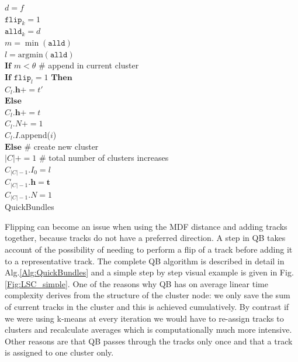 \documentclass[preprint,authoryear,a4paper,10pt,onecolumn]{elsarticle}
\begin{document}
\begin{algorithm}
\hspace*{6em} $d = f$\\
\hspace*{6em} $\texttt{flip}_{k} = 1$\\
\hspace*{4em} $\texttt{alld}_{k} = d$\\
$m=\min(\texttt{alld})$\\
$l=\mathrm{arg min}(\texttt{alld})$\\
$\textbf{If}$ $m < \theta$ \# append in current cluster \\
\hspace*{2em} $\textbf{If}$ $\texttt{flip}_{l}=1$ $\textbf{Then}$\\
\hspace*{4em} $C_{l}.\mathbf{h}+=t'$\\
\hspace*{2em} $\textbf{Else}$ \\
\hspace*{4em} $C_{l}.\mathbf{h}+=t$\\
\hspace*{2em} $C_{l}.N+=1$\\
\hspace*{2em} $C_{l}.I$.append($i$)\\
$\textbf{Else}$ \# create new cluster\\
\hspace*{2em} $|C|+=1$ \# total number of clusters increases\\
\hspace*{2em} $C_{|C|-1}.I_{0}=l$\\
\hspace*{2em} $C_{|C|-1}.\mathbf{h}=\mathbf{t}$\\
\hspace*{2em} $C_{|C|-1}.N=1$\\
\caption{QuickBundles}

\label{Alg:QuickBundles}
\end{algorithm}


Flipping can become an issue when using the MDF distance and adding
tracks together, because tracks do not have a preferred direction.
A step in QB takes account of the possibility of needing to perform
a flip of a track before adding it to a representative track. The
complete QB algorithm is described in detail in Alg.\ref{Alg:QuickBundles}
and a simple step by step visual example is given in Fig.\ref{Fig:LSC_simple}.
One of the reasons why QB has on average linear time complexity derives
from the structure of the cluster node: we only save the sum of current
tracks in the cluster and this is achieved cumulatively. By contrast
if we were using k-means at every iteration we would have to re-assign
tracks to clusters and recalculate averages which is computationally
much more intensive. Other reasons are that QB passes through the
tracks only once and that a track is assigned to one cluster only. 
\end{document}
